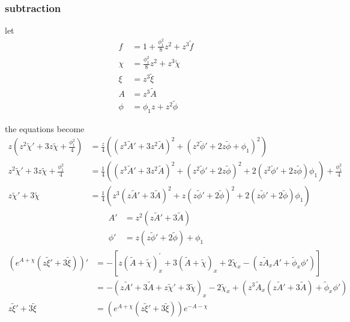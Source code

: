 \documentclass[12pt,a4paper]{ctexart}
\numberwithin{equation}{section}
\begin{document}
\subsubsection{subtraction}

let
\begin{equation}
    \begin{aligned}
        f&=1+\frac{\phi_1^2}{8}z^2+z^3\tilde{f}\\
        \chi&=\frac{\phi_1^2}{8}z^2+z^3\tilde{\chi}\\
        \xi&=z^3\tilde{\xi}\\
        A&=z^3\tilde{A}\\
        \phi&=\phi_1 z+z^2\tilde{\phi}
    \end{aligned}
\end{equation}

the equations become
\begin{equation}
    \begin{aligned}
        z(z^2\tilde{\chi}'+3z\tilde{\chi}+\frac{\phi_1^2}{4})&=\frac{z}{4}((z^3\tilde{A}'+3z^2\tilde{A})^2+(z^2\tilde{\phi}'+2z\tilde{\phi}+\phi_1)^2)\\
        z^2\tilde{\chi}'+3z\tilde{\chi}+\frac{\phi_1^2}{4}&=\frac{1}{4}((z^3\tilde{A}'+3z^2\tilde{A})^2+(z^2\tilde{\phi}'+2z\tilde{\phi})^2+2(z^2\tilde{\phi}'+2z\tilde{\phi})\phi_1)+\frac{\phi_1^2}{4}\\
        z\tilde{\chi}'+3\tilde{\chi}&=\frac{1}{4}(z^3(z\tilde{A}'+3\tilde{A})^2+z(z\tilde{\phi}'+2\tilde{\phi})^2+2(z\tilde{\phi}'+2\tilde{\phi})\phi_1)
    \end{aligned}
\end{equation}
\begin{equation}
    \begin{aligned}
        A'&=z^2(z\tilde{A}'+3\tilde{A})\\
        \phi'&=z(z\tilde{\phi}'+2\tilde{\phi})+\phi_1
    \end{aligned}
\end{equation}
\begin{equation}
    \begin{aligned}
        \left(e^{A+\chi}(z\tilde{\xi}'+3\tilde{\xi})\right)'&=-[z(\tilde{A}+\tilde{\chi})^{\prime}_{x}+3(\tilde{A}+\tilde{\chi})_{x}+2\tilde{\chi}_{x}-(z\tilde{A}_{x}A'+\tilde{\phi}_{x}\phi')]\\
        &=-(z\tilde{A}'+3\tilde{A}+z\tilde{\chi}'+3\tilde{\chi})_{x}-2\tilde{\chi}_{x}+(z^3\tilde{A}_{x}(z\tilde{A}'+3\tilde{A})+\tilde{\phi}_{x}\phi')\\
        z\tilde{\xi}'+3\tilde{\xi}&=\left(e^{A+\chi}(z\tilde{\xi}'+3\tilde{\xi})\right)e^{-A-\chi}
    \end{aligned}
\end{equation}
\end{document}

